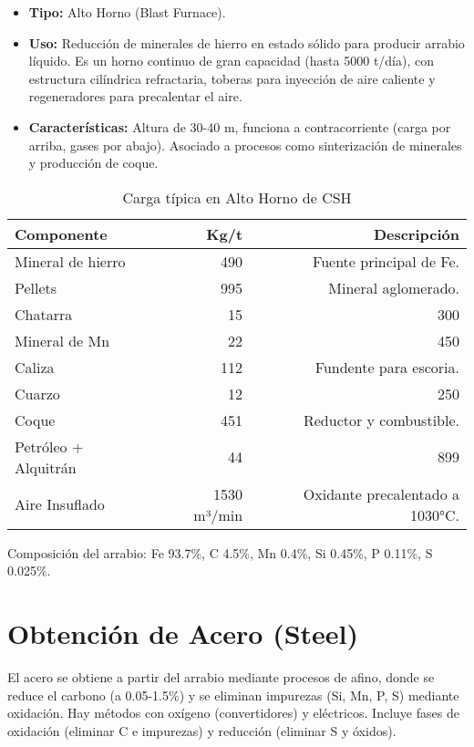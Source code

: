 \documentclass[12pt,a4paper]{article}
\begin{document}
\begin{itemize}
    \item \textbf{Tipo:} Alto Horno (Blast Furnace).
    \item \textbf{Uso:} Reducción de minerales de hierro en estado sólido para producir arrabio líquido. Es un horno continuo de gran capacidad (hasta 5000 t/día), con estructura cilíndrica refractaria, toberas para inyección de aire caliente y regeneradores para precalentar el aire.
    \item \textbf{Características:} Altura de 30-40 m, funciona a contracorriente (carga por arriba, gases por abajo). Asociado a procesos como sinterización de minerales y producción de coque.
\end{itemize}
\begin{table}[h]
    \centering
    \caption{Carga típica en Alto Horno de CSH}
    \begin{tabular}{|l|r|r|}
        \hline
        Componente & Kg/t & Descripción \\ \hline
        Mineral de hierro & 490 & Fuente principal de Fe. \\
        Pellets & 995 & Mineral aglomerado. \\
        Chatarra & 15 & 300 \\
        Mineral de Mn & 22 & 450 \\
        Caliza & 112 & Fundente para escoria. \\
        Cuarzo & 12 & 250 \\
        Coque & 451 & Reductor y combustible. \\
        Petróleo + Alquitrán & 44 & 899 \\
        Aire Insuflado & 1530 m³/min & Oxidante precalentado a 1030°C. \\
        \hline
    \end{tabular}
\end{table}
Composición del arrabio: Fe 93.7\%, C 4.5\%, Mn 0.4\%, Si 0.45\%, P 0.11\%, S 0.025\%.

\section{Obtención de Acero (Steel)}

El acero se obtiene a partir del arrabio mediante procesos de afino, donde se reduce el carbono (a 0.05-1.5\%) y se eliminan impurezas (Si, Mn, P, S) mediante oxidación. Hay métodos con oxígeno (convertidores) y eléctricos. Incluye fases de oxidación (eliminar C e impurezas) y reducción (eliminar S y óxidos).
\end{document}
